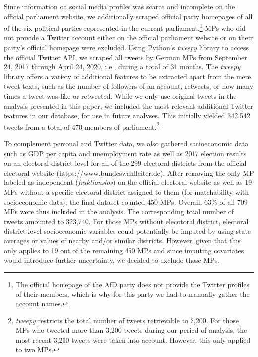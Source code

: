 Since information on social media profiles was scarce and incomplete on the official parliament website, we additionally scraped official party homepages of all of the six political parties represented in the current parliament.\footnote{The official homepage of the AfD party does not provide the Twitter profiles of their members, which is why for this party we had to manually gather the account names.} MPs who did not provide a Twitter account either on the official parliament website or on their party's official homepage were excluded. Using Python's \textit{tweepy} library to access the official Twitter API, we scraped all tweets by German MPs from September 24, 2017 through April 24, 2020, i.e., during a total of 31 months. The \textit{tweepy} library offers a variety of additional features to be extracted apart from the mere tweet texts, such as the number of followers of an account, retweets, or how many times a tweet was like or retweeted. While we only use original tweets in the analysis presented in this paper, we included the most relevant additional Twitter features in our database, for use in future analyses. This initially yielded 342,542 tweets from a total of 470 members of parliament.\footnote{\textit{tweepy} restricts the total number of tweets retrievable to 3,200. For those MPs who tweeted more than 3,200 tweets during our period of analysis, the most recent 3,200 tweets were taken into account. However, this only applied to two MPs.}

To complement personal and Twitter data, we also gathered socioeconomic data such as GDP per capita and unemployment rate as well as 2017 election results on an electoral-district level for all of the 299 electoral districts from the official electoral website (https://www.bundeswahlleiter.de). After removing the only MP labeled as independent (\textit{fraktionslos}) on the official electoral website as well as 19 MPs without a specific electoral district assigned to them (for matchability with socioeconomic data), the final dataset counted 450 MPs. Overall, 63\% of all 709 MPs were thus included in the analysis. The corresponding total number of tweets amounted to 323,740. For those MPs without elecotoral district, electoral district-level socioeconomic variables could potentially be imputed by using state averages or values of nearby and/or similar districts. However, given that this only applies to 19 out of the remaining 450 MPs and since imputing covariates would introduce further uncertainty, we decided to exclude those MPs.

